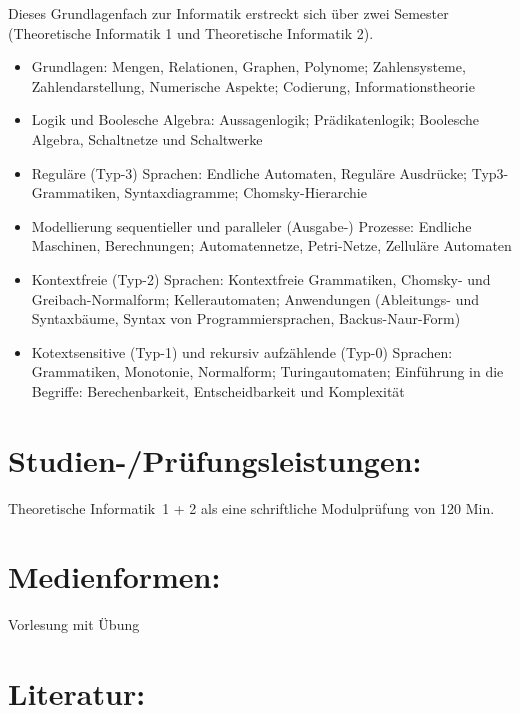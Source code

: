 Dieses Grundlagenfach zur Informatik erstreckt sich über zwei Semester
(Theoretische Informatik 1 und Theoretische Informatik 2).

\begin{itemize}
\item
  Grundlagen: Mengen, Relationen, Graphen, Polynome; Zahlensysteme,
  Zahlendarstellung, Numerische Aspekte; Codierung, Informationstheorie
\item
  Logik und Boolesche Algebra: Aussagenlogik; Prädikatenlogik; Boolesche
  Algebra, Schaltnetze und Schaltwerke
\item
  Reguläre (Typ-3) Sprachen: Endliche Automaten, Reguläre Ausdrücke;
  Typ3-Grammatiken, Syntaxdiagramme; Chomsky-Hierarchie
\item
  Modellierung sequentieller und paralleler (Ausgabe-) Prozesse:
  Endliche Maschinen, Berechnungen; Automatennetze, Petri-Netze,
  Zelluläre Automaten
\item
  Kontextfreie (Typ-2) Sprachen: Kontextfreie Grammatiken, Chomsky- und
  Greibach-Normalform; Kellerautomaten; Anwendungen (Ableitungs- und
  Syntaxbäume, Syntax von Programmiersprachen, Backus-Naur-Form)
\item
  Kotextsensitive (Typ-1) und rekursiv aufzählende (Typ-0) Sprachen:
  Grammatiken, Monotonie, Normalform; Turingautomaten; Einführung in die
  Begriffe: Berechenbarkeit, Entscheidbarkeit und Komplexität
\end{itemize}

\section*{Studien-/Prüfungsleistungen:}\label{studien-pruxfcfungsleistungen-22}

Theoretische Informatik~1 + 2 als eine schriftliche Modulprüfung von 120
Min.

\section*{Medienformen:}\label{medienformen-16}

Vorlesung mit Übung

\section*{Literatur:}\label{literatur-23}

